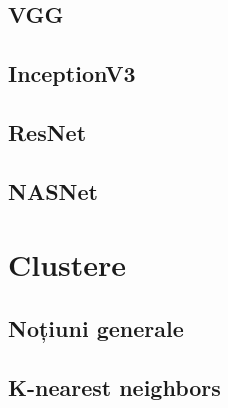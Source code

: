 \subsection{VGG}

\subsection{InceptionV3}

\subsection{ResNet}

\subsection{NASNet}



\section{Clustere}

\subsection{Noțiuni generale}

\subsection{K-nearest neighbors}
